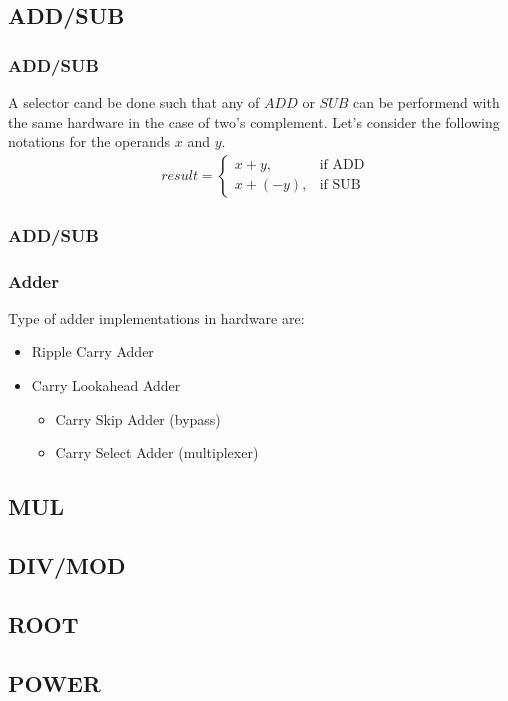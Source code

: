 \subsection{ADD/SUB}

\begin{frame}
    \frametitle{ADD/SUB}
    A selector cand be done such that any of $ADD$ or $SUB$ can be performend with the same hardware in the case of two's complement.
    Let's consider the following notations for the operands $x$ and $y$.
    \begin{equation}
        \begin{aligned}
            &result=
                \begin{cases}
                    x+y,& \text{if ADD}\\
                    x+(-y), & \text{if SUB}
                \end{cases}
        \end{aligned}
    \end{equation}
\end{frame}

\begin{frame}
    \frametitle{ADD/SUB}
\end{frame}

\begin{frame}
    \frametitle{Adder}
    Type of adder implementations in hardware are:
    \begin{itemize}
        \item Ripple Carry Adder
        \item Carry Lookahead Adder
            \begin{itemize}
                \item Carry Skip Adder (bypass)
                \item Carry Select Adder (multiplexer)
            \end{itemize}
    \end{itemize}
\end{frame}

\subsection{MUL}

\subsection{DIV/MOD}

\subsection{ROOT}

\subsection{POWER}
